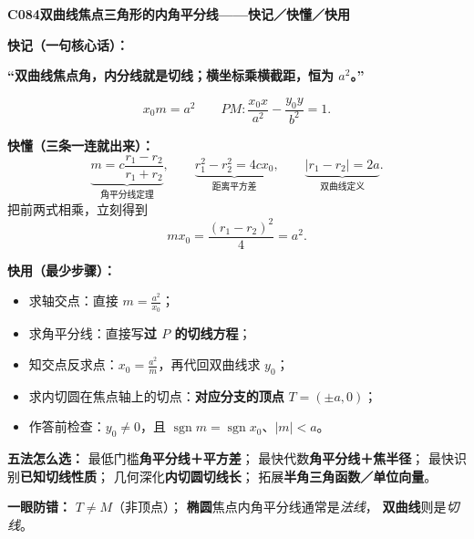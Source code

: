 \begin{summarybox}
\textbf{C084\quad 双曲线焦点三角形的内角平分线——快记／快懂／快用}

\textbf{快记（一句核心话）：}
\begin{center}
\textbf{“双曲线焦点角，内分线就是切线；横坐标乘横截距，恒为 $a^2$。”}
\end{center}
\[
\boxed{x_0m=a^2}\qquad
\boxed{PM:\frac{x_0x}{a^2}-\frac{y_0y}{b^2}=1}.
\]

\textbf{快懂（三条一连就出来）：}
\[
\underbrace{m=c\frac{r_1-r_2}{r_1+r_2}}_{\text{角平分线定理}},\qquad
\underbrace{r_1^2-r_2^2=4cx_0}_{\text{距离平方差}},\qquad
\underbrace{|r_1-r_2|=2a}_{\text{双曲线定义}}.
\]
把前两式相乘，立刻得到
\[
mx_0=\frac{(r_1-r_2)^2}{4}=a^2.
\]

\textbf{快用（最少步骤）：}
\begin{itemize}
  \item 求轴交点：直接 $\displaystyle m=\frac{a^2}{x_0}$；
  \item 求角平分线：直接写\textbf{过 $P$ 的切线方程}；
  \item 知交点反求点：$\displaystyle x_0=\frac{a^2}{m}$，再代回双曲线求 $y_0$；
  \item 求内切圆在焦点轴上的切点：\textbf{对应分支的顶点} $T=(\pm a,0)$；
  \item 作答前检查：$y_0\ne0$，且 $\operatorname{sgn}m=\operatorname{sgn}x_0$、$|m|<a$。
\end{itemize}

\textbf{五法怎么选：}
最低门槛\textbf{角平分线＋平方差}；
最快代数\textbf{角平分线＋焦半径}；
最快识别\textbf{已知切线性质}；
几何深化\textbf{内切圆切线长}；
拓展\textbf{半角三角函数／单位向量}。

\textbf{一眼防错：} $\boxed{T\ne M}$（非顶点）；
\textbf{椭圆}焦点内角平分线通常是\emph{法线}，
\textbf{双曲线}则是\emph{切线}。
\end{summarybox}

